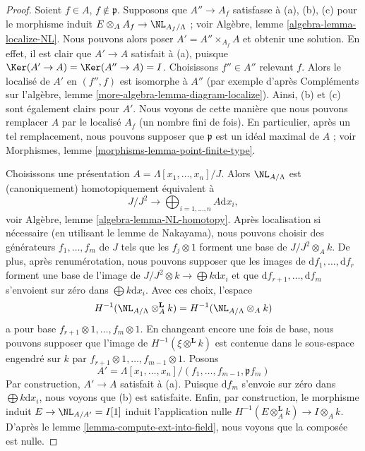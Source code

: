 \begin{proof}
Soient $f \in A$, $f \not \in \mathfrak p$. Supposons que $A'' \to A_f$
satisfasse à (a), (b), (c) pour le morphisme induit
$E \otimes_A A_f \to \NL_{A_f/\Lambda}$ ; voir Algèbre, lemme
\ref{algebra-lemma-localize-NL}. Nous pouvons alors poser
$A' = A'' \times_{A_f} A$ et obtenir une solution. En effet, il est clair que
$A' \to A$ satisfait à (a), puisque
$\Ker(A' \to A) = \Ker(A'' \to A) = I$. Choisissons $f'' \in A''$ relevant
$f$. Alors le localisé de $A'$ en $(f'', f)$ est isomorphe à $A''$ (par
exemple d'après Compléments sur l'algèbre, lemme
\ref{more-algebra-lemma-diagram-localize}). Ainsi, (b) et (c) sont également
clairs pour $A'$. Nous voyons de cette manière que nous pouvons remplacer $A$
par le localisé $A_f$ (un nombre fini de fois). En particulier, après un tel
remplacement, nous pouvons supposer que $\mathfrak p$ est un idéal maximal de
$A$ ; voir Morphismes, lemme \ref{morphisms-lemma-point-finite-type}.

\medskip\noindent
Choisissons une présentation $A = \Lambda[x_1, \ldots, x_n]/J$. Alors
$\NL_{A/\Lambda}$ est (canoniquement) homotopiquement équivalent à
$$
J/J^2
\longrightarrow
\bigoplus\nolimits_{i = 1, \ldots, n} A\text{d}x_i,
$$
voir Algèbre, lemme \ref{algebra-lemma-NL-homotopy}. Après localisation si
nécessaire (en utilisant le lemme de Nakayama), nous pouvons choisir des
générateurs $f_1, \ldots, f_m$ de $J$ tels que les $f_j \otimes 1$ forment une
base de $J/J^2 \otimes_A k$. De plus, après renumérotation, nous pouvons
supposer que les images de $\text{d}f_1, \ldots, \text{d}f_r$ forment une
base de l'image de $J/J^2 \otimes k \to \bigoplus k\text{d}x_i$ et que
$\text{d}f_{r + 1}, \ldots, \text{d}f_m$ s'envoient sur zéro dans
$\bigoplus k\text{d}x_i$. Avec ces choix, l'espace
$$
H^{-1}(\NL_{A/\Lambda} \otimes^{\mathbf{L}}_A k) =
H^{-1}(\NL_{A/\Lambda} \otimes_A k)
$$
a pour base $f_{r + 1} \otimes 1, \ldots, f_m \otimes 1$. En changeant encore
une fois de base, nous pouvons supposer que l'image de
$H^{-1}(\xi \otimes^{\mathbf{L}} k)$ est contenue dans le sous-espace engendré
sur $k$ par $f_{r + 1} \otimes 1, \ldots, f_{m - 1} \otimes 1$. Posons
$$
A' = \Lambda[x_1, \ldots, x_n]/(f_1, \ldots, f_{m - 1}, \mathfrak pf_m)
$$
Par construction, $A' \to A$ satisfait à (a). Puisque $\text{d}f_m$ s'envoie
sur zéro dans $\bigoplus k\text{d}x_i$, nous voyons que (b) est satisfaite.
Enfin, par construction, le morphisme induit $E \to \NL_{A/A'} = I[1]$
induit l'application nulle
$H^{-1}(E \otimes_A^\mathbf{L} k) \to I \otimes_A k$. D'après le lemme
\ref{lemma-compute-ext-into-field}, nous voyons que la composée est nulle.
\end{proof}

